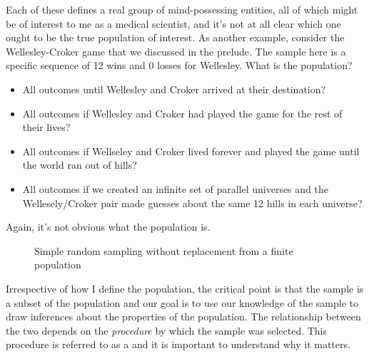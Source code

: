 Each of these defines a real group of mind-possessing entities, all of which might be of interest to me as a medical scientist, and it's not at all clear which one ought to be the true population of interest. As another example, consider the Wellesley-Croker game that we discussed in the prelude. The sample here is a specific sequence of 12 wins and 0 losses for Wellesley. What is the population?
\begin{itemize} \itemsep -2pt
\item All outcomes until Wellesley and Croker arrived at their destination?
\item All outcomes if Wellesley and Croker had played the game for the rest of their lives?
\item All outcomes if Wellseley and Croker lived forever and played the game until the world ran out of hills?
\item All outcomes if we created an infinite set of parallel universes and the Wellesely/Croker pair made guesses about the same 12 hills in each universe?
\end{itemize}
Again, it's not obvious what the population is.


\begin{figure}[t]
\begin{center}
\end{center}
\caption{Simple random sampling without replacement from a finite population}
\label{fig:srs1}
\HR
\end{figure}

Irrespective of how I define the population, the critical point is that the sample is a subset of the population and our goal is to use our knowledge of the sample to draw inferences about the properties of the population. The relationship between the two depends on the {\it procedure} by which the sample was selected. This procedure is referred to as a  and it is important to understand why it matters.

